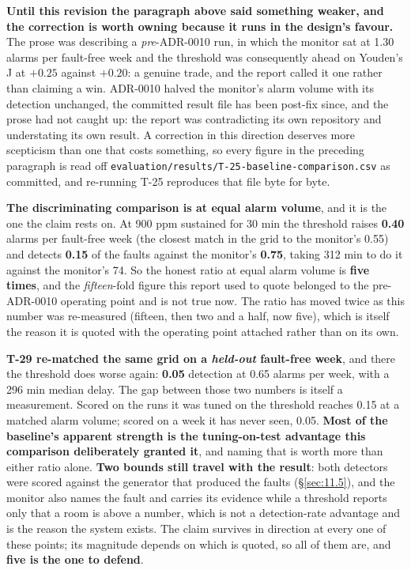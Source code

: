 \textbf{Until this revision the paragraph above said something weaker, and the correction is worth
owning because it runs in the design's favour.} The prose was describing a \emph{pre}-ADR-0010 run,
in which the monitor sat at 1.30 alarms per fault-free week and the threshold was consequently
ahead on Youden's J at $+0.25$ against $+0.20$: a genuine trade, and the report called it one
rather than claiming a win. ADR-0010 halved the monitor's alarm volume with its detection
unchanged, the committed result file has been post-fix since, and the prose had not caught up: the
report was contradicting its own repository and understating its own result. A correction in this
direction deserves more scepticism than one that costs something, so every figure in the preceding
paragraph is read off \texttt{evaluation/results/T-25-baseline-comparison.csv} as committed, and
re-running T-25 reproduces that file byte for byte.

\textbf{The discriminating comparison is at equal alarm volume}, and it is the one the claim rests
on. At 900 ppm sustained for 30 min the threshold raises \textbf{0.40} alarms per fault-free week
(the closest match in the grid to the monitor's 0.55) and detects \textbf{0.15} of the faults
against the monitor's \textbf{0.75}, taking 312 min to do it against the monitor's 74. So the
honest ratio at equal alarm volume is \textbf{five times}, and the \emph{fifteen}-fold figure this
report used to quote belonged to the pre-ADR-0010 operating point and is not true now. The ratio has
moved twice as this number was re-measured (fifteen, then two and a half, now five), which is
itself the reason it is quoted with the operating point attached rather than on its own.

\textbf{T-29 re-matched the same grid on a \emph{held-out} fault-free week}, and there the threshold
does worse again: \textbf{0.05} detection at 0.65 alarms per week, with a 296 min median delay.
The gap between those two numbers is itself a measurement. Scored on the runs it was tuned on the
threshold reaches 0.15 at a matched alarm volume; scored on a week it has never seen, 0.05.
\textbf{Most of the baseline's apparent strength is the tuning-on-test advantage this comparison
deliberately granted it}, and naming that is worth more than either ratio alone. \textbf{Two bounds still travel with the result}: both
detectors were scored against the generator that produced the faults (§\ref{sec:11.5}), and the monitor also
names the fault and carries its evidence while a threshold reports only that a room is above a
number, which is not a detection-rate advantage and is the reason the system exists. The claim
survives in direction at every one of these points; its magnitude depends on which is quoted, so
all of them are, and \textbf{five is the one to defend}.

